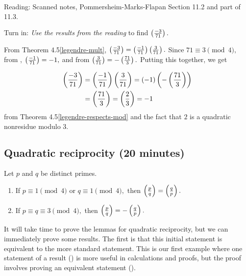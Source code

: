 \documentclass[letterpaper, 11 pt]{ximera}
\begin{document}
\begin{pre}
    \item[Reading:] Scanned notes, Pommersheim-Marks-Flapan Section 11.2 and part of 11.3.
    \item[Turn in:] \emph{Use the results from the reading} to find $\left(\frac{-3}{71}\right).$

     \begin{solution}
     	From Theorem 4.5\ref{legendre-mult}, $\left(\frac{-3}{71}\right)=\left(\frac{-1}{71}\right)\left(\frac{3}{71}\right).$
     	Since $71\equiv3\pmod{4},$ from , $\left(\frac{-1}{71}\right)=-1,$
	and from  $\left(\frac{3}{71}\right)=-\left(\frac{71}{3}\right).$ Putting this together, we get
	
		\begin{align*}
		 	\left(\frac{-3}{71}\right)&=\left(\frac{-1}{71}\right)\left(\frac{3}{71}\right)=(-1)\left(-\left(\frac{71}{3}\right)\right)\\
				&=\left(\frac{71}{3}\right)=\left(\frac{2}{3}\right)=-1
		\end{align*}
	from Theorem 4.5\ref{legendre-respects-mod} and the fact that $2$ is a quadratic nonresidue modulo $3.$
     \end{solution}
\end{pre}


\subsection{Quadratic reciprocity (20 minutes)}

\begin{thm*}\label{quad-rec-useful-form}
	Let $p$ and $q$ be distinct primes.  
	\begin{enumerate}[label=(\alph*)]
		\item If $p\equiv 1 \pmod{4}$ or $q\equiv 1\pmod{4},$ then $\left(\frac{p}{q}\right)=\left(\frac{q}{p}\right).$
 		\item If $p\equiv q \equiv 3 \pmod{4},$ then $\left(\frac{p}{q}\right)=-\left(\frac{q}{p}\right).$
	\end{enumerate}
\end{thm*}

It will take time to prove the lemmas for quadratic reciprocity, but we can immediately prove some results. 
The first is that this initial statement is equivalent to the more standard statement. This is our first example where one statement of a result () is more useful in calculations and proofs, but the proof involves proving an equivalent statement ().
\end{document}
